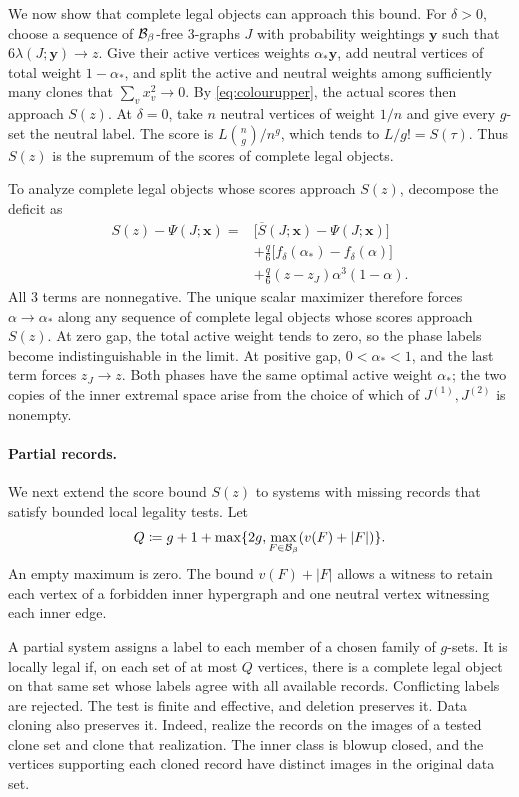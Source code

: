\documentclass[10pt]{article}
\numberwithin{equation}{section}
\theoremstyle{definition}
\newcommand{\x}{\boldsymbol{x}}\newcommand{\y}{\boldsymbol{y}}
\begin{document}
We now show that complete legal objects can approach this bound. For $\delta>0$, choose a sequence of $\mathcal B_\beta$-free $3$-graphs $J$ with probability weightings $\y$ such that $6\lambda(J;\y)\to z$. Give their active vertices weights $\alpha_*\y$, add neutral vertices of total weight $1-\alpha_*$, and split the active and neutral weights among sufficiently many clones that $\sum_vx_v^2\to0$. By \eqref{eq:colourupper}, the actual scores then approach $S(z)$. At $\delta=0$, take $n$ neutral vertices of weight $1/n$ and give every $g$-set the neutral label. The score is $L\binom ng/n^g$, which tends to $L/g!=S(\tau)$. Thus $S(z)$ is the supremum of the scores of complete legal objects.

To analyze complete legal objects whose scores approach $S(z)$, decompose the deficit as
\begin{equation}\label{eq:phasedeficit}
 \begin{aligned}
 S(z)-\Psi(J;\x)
 ={}&\bigl[\overline S(J;\x)-\Psi(J;\x)\bigr]\\
 &+\frac q{6}\bigl[f_\delta(\alpha_*)-f_\delta(\alpha)\bigr]\\
 &+\frac q{6}(z-z_J)\alpha^3(1-\alpha).
 \end{aligned}
\end{equation}
All 3 terms are nonnegative. The unique scalar maximizer therefore forces $\alpha\to\alpha_*$ along any sequence of complete legal objects whose scores approach $S(z)$. At zero gap, the total active weight tends to zero, so the phase labels become indistinguishable in the limit. At positive gap, $0<\alpha_*<1$, and the last term forces $z_J\to z$. Both phases have the same optimal active weight $\alpha_*$; the two copies of the inner extremal space arise from the choice of which of $J^{(1)},J^{(2)}$ is nonempty.

\paragraph{Partial records.}
We next extend the score bound $S(z)$ to systems with missing records that satisfy bounded local legality tests. Let
\[
 Q\coloneqq g+1+\max\{2g,\max_{F\in\mathcal B_\beta}(v(F)+|F|)\}.
\]
An empty maximum is zero. The bound $v(F)+|F|$ allows a witness to retain each vertex of a forbidden inner hypergraph and one neutral vertex witnessing each inner edge.

A partial system assigns a label to each member of a chosen family of $g$-sets. It is locally legal if, on each set of at most $Q$ vertices, there is a complete legal object on that same set whose labels agree with all available records. Conflicting labels are rejected. The test is finite and effective, and deletion preserves it. Data cloning also preserves it. Indeed, realize the records on the images of a tested clone set and clone that realization. The inner class is blowup closed, and the vertices supporting each cloned record have distinct images in the original data set.
\end{document}
